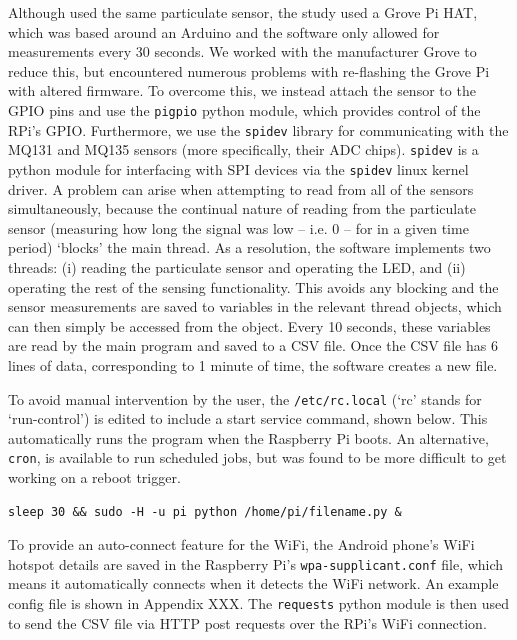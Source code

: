 \documentclass[11pt,twosided,a4paper]{report}
\begin{document}
Although \cite{thorpe2017RPimesh} used the same particulate sensor, the study used a Grove Pi HAT, which was based around an Arduino and the software only allowed for measurements every 30 seconds. We worked with the manufacturer Grove to reduce this, but encountered numerous problems with re-flashing the Grove Pi with altered firmware. To overcome this, we instead attach the sensor to the GPIO pins and use the \texttt{pigpio} python module, which provides control of the RPi's GPIO. Furthermore, we use the \texttt{spidev} library for communicating with the MQ131 and MQ135 sensors (more specifically, their ADC chips). \texttt{spidev} is a python module for interfacing with SPI devices via the \texttt{spidev} linux kernel driver. A problem can arise when attempting to read from all of the sensors simultaneously, because the continual nature of reading from the particulate sensor (measuring how long the signal was low -- i.e. 0 -- for in a given time period) `blocks' the main thread. As a resolution, the software implements two threads: (i) reading the particulate sensor and operating the LED, and (ii) operating the rest of the sensing functionality. This avoids any blocking and the sensor measurements are saved to variables in the relevant thread objects, which can then simply be accessed from the object. Every 10 seconds, these variables are read by the main program and saved to a CSV file. Once the CSV file has 6 lines of data, corresponding to 1 minute of time, the software creates a new file.

To avoid manual intervention by the user, the \texttt{/etc/rc.local} (`rc' stands for `run-control') is edited to include a start service command, shown below. This automatically runs the program when the Raspberry Pi boots. An alternative, \texttt{cron}, is available to run scheduled jobs, but was found to be more difficult to get working on a reboot trigger.
\begin{lstlisting}
sleep 30 && sudo -H -u pi python /home/pi/filename.py &
\end{lstlisting}

To provide an auto-connect feature for the WiFi, the Android phone's WiFi hotspot details are saved in the Raspberry Pi's \texttt{wpa-supplicant.conf} file, which means it automatically connects when it detects the WiFi network. An example config file is shown in Appendix XXX. The \texttt{requests} python module is then used to send the CSV file via HTTP post requests over the RPi's WiFi connection.
\end{document}
